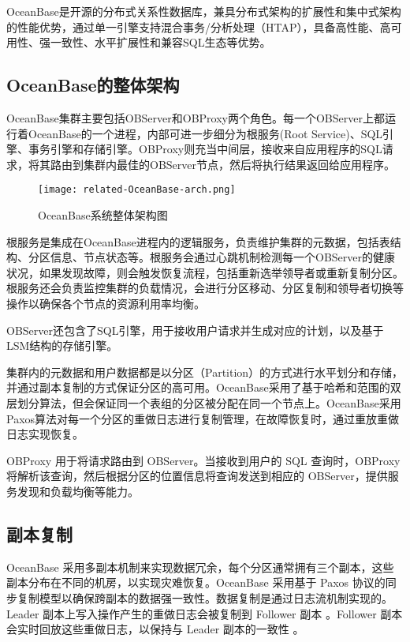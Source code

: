OceanBase是开源的分布式关系性数据库，兼具分布式架构的扩展性和集中式架构的性能优势，通过单一引擎支持混合事务/分析处理（HTAP），具备高性能、高可用性、强一致性、水平扩展性和兼容SQL生态等优势。

\subsection{OceanBase的整体架构}

OceanBase集群主要包括OBServer和OBProxy两个角色。每一个OBServer上都运行着OceanBase的一个进程，内部可进一步细分为根服务(Root Service)、SQL引擎、事务引擎和存储引擎。OBProxy则充当中间层，接收来自应用程序的SQL请求，将其路由到集群内最佳的OBServer节点，然后将执行结果返回给应用程序。

\begin{figure}
  \centering
  \texttt{[image: related-OceanBase-arch.png]}
  \caption{OceanBase系统整体架构图}
  \label{fig:OceanBase-arch}
\end{figure}

根服务是集成在OceanBase进程内的逻辑服务，负责维护集群的元数据，包括表结构、分区信息、节点状态等。根服务会通过心跳机制检测每一个OBServer的健康状况，如果发现故障，则会触发恢复流程，包括重新选举领导者或重新复制分区。根服务还会负责监控集群的负载情况，会进行分区移动、分区复制和领导者切换等操作以确保各个节点的资源利用率均衡。

OBServer还包含了SQL引擎，用于接收用户请求并生成对应的计划，以及基于LSM结构的存储引擎。

集群内的元数据和用户数据都是以分区（Partition）的方式进行水平划分和存储，并通过副本复制的方式保证分区的高可用。OceanBase采用了基于哈希和范围的双层划分算法，但会保证同一个表组的分区被分配在同一个节点上。OceanBase采用Paxos算法对每一个分区的重做日志进行复制管理，在故障恢复时，通过重放重做日志实现恢复。

OBProxy 用于将请求路由到 OBServer。当接收到用户的 SQL 查询时，OBProxy 将解析该查询，然后根据分区的位置信息将查询发送到相应的 OBServer，提供服务发现和负载均衡等能力。


\subsection{副本复制}

OceanBase 采用多副本机制来实现数据冗余，每个分区通常拥有三个副本，这些副本分布在不同的机房，以实现灾难恢复。OceanBase 采用基于 Paxos 协议的同步复制模型以确保跨副本的数据强一致性。数据复制是通过日志流机制实现的。Leader 副本上写入操作产生的重做日志会被复制到 Follower 副本 。Follower 副本会实时回放这些重做日志，以保持与 Leader 副本的一致性 。


